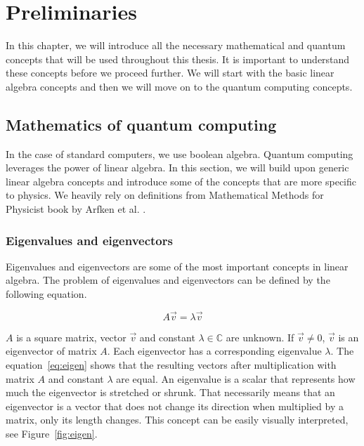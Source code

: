\graphicspath{ {../images/}}

\chapter{Preliminaries}\label{ch:preliminaries}
In this chapter, we will introduce all the necessary mathematical and quantum concepts that will be used throughout this thesis. It is important to understand these concepts before we proceed further. We will start with the basic linear algebra concepts and then we will move on to the quantum computing concepts.
\section{Mathematics of quantum computing}
In the case of standard computers, we use boolean algebra. Quantum computing leverages the power of linear algebra. In this section, we will build upon generic linear algebra concepts and introduce some of the concepts that are more specific to physics. We heavily rely on definitions from Mathematical Methods for Physicist book by Arfken et al. \cite{mmp}.

\subsection{Eigenvalues and eigenvectors}
Eigenvalues and eigenvectors are some of the most important concepts in linear algebra. The problem of eigenvalues and eigenvectors can be defined by the following equation. 

\begin{equation}
  A\vec{v} = \lambda \vec{v}
  \label{eq:eigen}
\end{equation}

\noindent $A$ is a square matrix, vector $\vec{v}$ and constant $\lambda \in \mathbb{C}$ are unknown. If $\vec{v} \neq 0$, $\vec{v}$ is an eigenvector of matrix $A$. Each eigenvector has a corresponding eigenvalue $\lambda$. The equation~\ref{eq:eigen} shows that the resulting vectors after multiplication with matrix $A$ and constant $\lambda$ are equal. An eigenvalue is a scalar that represents how much the eigenvector is stretched or shrunk. That necessarily means that an eigenvector is a vector that does not change its direction when multiplied by a matrix, only its length changes. This concept can be easily visually interpreted, see Figure~\ref{fig:eigen}.

